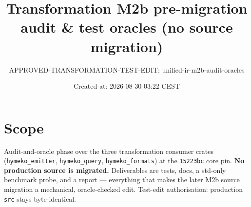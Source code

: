 \documentclass[11pt]{article}
\title{Transformation M2b pre-migration audit \& test oracles (no source migration)}
\author{APPROVED-TRANSFORMATION-TEST-EDIT: unified-ir-m2b-audit-oracles}
\date{Created-at: 2026-08-30 03:22 CEST}
\begin{document}
\maketitle

\section*{Scope}
Audit-and-oracle phase over the three transformation consumer crates
(\texttt{hymeko\_emitter}, \texttt{hymeko\_query}, \texttt{hymeko\_formats}) at the
\texttt{15223bc} core pin. \textbf{No production source is migrated.} Deliverables
are tests, docs, a std-only benchmark probe, and a report --- everything that
makes the later M2b source migration a mechanical, oracle-checked edit. Test-edit
authorisation: production \texttt{src} stays byte-identical.
\end{document}
